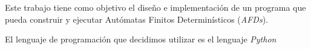 Este trabajo tiene como objetivo el diseño e implementación de un programa que pueda construir y ejecutar Autómatas Finitos Determinísticos (\emph{AFDs}).

El lenguaje de programación que decidimos utilizar es el lenguaje \emph{Python}